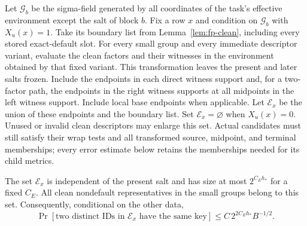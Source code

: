 Let $\mathcal G_b$ be the sigma-field generated by all coordinates of the
task's effective environment except the salt of block $b$.  Fix a row
$x$ and condition on $\mathcal G_b$ with $X_u(x)=1$.  Take its boundary list from
Lemma~\ref{lem:fp-clean}, including every stored exact-default slot.
For every small group and every immediate
descriptor variant, evaluate the clean factors and their witnesses in
the environment obtained by that fixed variant.  This transformation
leaves the present and later salts frozen.  Include the endpoints in
each direct witness support and, for a two-factor path, the endpoints
in the right witness supports at all midpoints in the left witness
support.  Include local base endpoints when applicable.  Let
$\mathcal E_x$ be the union of these endpoints and the boundary list.
Set $\mathcal E_x=\varnothing$ when $X_u(x)=0$.
Unused or invalid clean descriptors may enlarge this set.  Actual
candidates must still satisfy their wrap tests and all transformed
source, midpoint, and terminal memberships; every error estimate below
retains the memberships needed for its child metrics.

\begin{lemma}
\label{lem:fp-envelope}
The set $\mathcal E_x$ is independent of the present salt and has size at
most $2^{C_Eh_*}$ for a fixed $C_E$.  All clean nondefault representatives
in the small groups belong to this set.  Consequently, conditional on
the other data,
\begin{equation}
 \Pr[\text{two distinct IDs in $\mathcal E_x$ have the same key}]
 \le C\,2^{2C_Eh_*}B^{-1/2}.
 \label{eq:fp-envelope-collision}
\end{equation}
\end{lemma}

